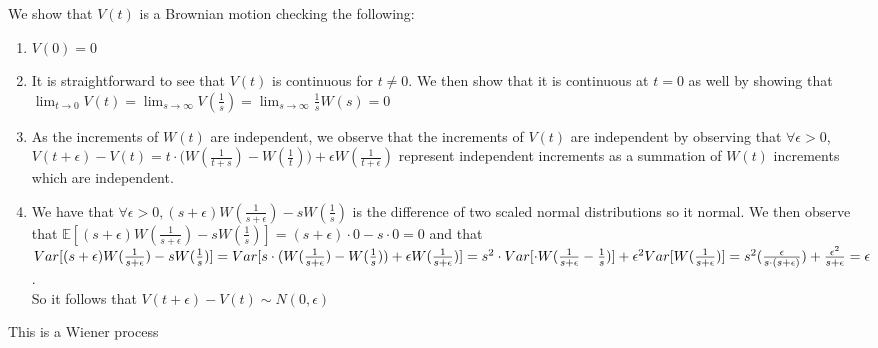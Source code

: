 \documentclass[12pt,twoside, letter]{exam}
\theoremstyle{definition}
\newcommand{\ee}{\mathbb{E}}
\begin{document}
\begin{solution}
  We show that $V(t)$ is a Brownian motion checking the following:
    \begin{enumerate}
      \item $V(0) = 0$
      \item It is straightforward to see that $V(t)$ is continuous for $t \neq 0$. We then show that it is continuous at $t = 0$ as well by showing that
        $\lim_{t \rightarrow 0} V(t) = \lim_{s \rightarrow \infty} V(\frac{1}{s}) = \lim_{s \rightarrow \infty} \frac{1}{s} W(s) = 0$
      \item As the increments of $W(t)$ are independent, we observe that the increments of $V(t)$ are independent by observing that $\forall \epsilon > 0$,
        $V(t + \epsilon) - V(t) = t\cdot \big( W(\frac{1}{t+s}) - W(\frac{1}{t}) \big) + \epsilon W(\frac{1}{t + \epsilon})$ represent independent increments
        as a summation of $W(t)$ increments which are independent.
      \item We have that $\forall \epsilon > 0, (s + \epsilon)W(\frac{1}{s + \epsilon}) - sW(\frac{1}{s})$ is the difference of two scaled normal distributions
        so it normal. We then observe that $\ee[ (s + \epsilon)W(\frac{1}{s + \epsilon}) - sW(\frac{1}{s})] = (s+\epsilon)\cdot 0 - s\cdot 0 = 0$ and that
        $Var[(s + \epsilon)W(\frac{1}{s + \epsilon}) - sW(\frac{1}{s})] = Var[s\cdot (W(\frac{1}{s+\epsilon}) - W(\frac{1}{s}))
        + \epsilon W(\frac{1}{s + \epsilon}) ] \\
        = s^2 \cdot Var[\cdot W(\frac{1}{s+\epsilon} - \frac{1}{s})]  + \epsilon^2 Var[ W(\frac{1}{s + \epsilon}) ] \\
        = s^2 (\frac{\epsilon}{s\cdot (s+ \epsilon)}) + \frac{\epsilon^2}{s+\epsilon} = \epsilon$. \\
        So it follows that $V(t + \epsilon) - V(t) \sim N(0, \epsilon)$
    \end{enumerate}
  This is a Wiener process
\end{solution}
\end{document}
